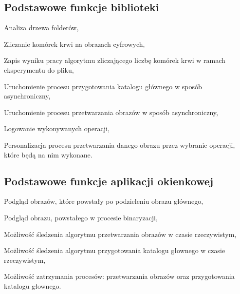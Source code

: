 \documentclass{article}
\begin{document}
        \newpage
        \subsection{Podstawowe funkcje biblioteki}
        {
            \Large
            \quad
            \begin{enumerate}
                \color{blue}
                {
                \item Analiza drzewa folderów,
                \item Zliczanie komórek krwi na obrazach cyfrowych,
                \item Zapis wyniku pracy algorytmu zliczającego liczbę komórek krwi w ramach eksperymentu do pliku,
                \item Uruchomienie procesu przygotowania katalogu głównego w sposób asynchroniczny,
                \item Uruchomienie procesu przetwarzania obrazów w sposób asynchroniczny,
                \item Logowanie wykonywanych operacji,
                \item Personalizacja procesu przetwarzania danego obrazu przez wybranie operacji, które będą na nim wykonane.
                }
            \end{enumerate}
        }

        \subsection{Podstawowe funkcje aplikacji okienkowej}
        {
            \Large
            \quad
            \begin{enumerate}
                \color{blue}
                {
                \item Podgląd obrazów, które powstały po podzieleniu obrazu głównego,
                \item Podgląd obrazu, powstałego w procesie binaryzacji,
                \item Możliwość śledzenia algorytmu przetwarzania obrazów w czasie rzeczywistym,
                \item Możliwość śledzenia algorytmu przygotowania katalogu głownego w czasie rzeczywistym,
                \item Możliwość zatrzymania procesów: przetwarzania obrazów oraz przygotowania katalogu głownego.
                }
            \end{enumerate}
        }
\end{document}
